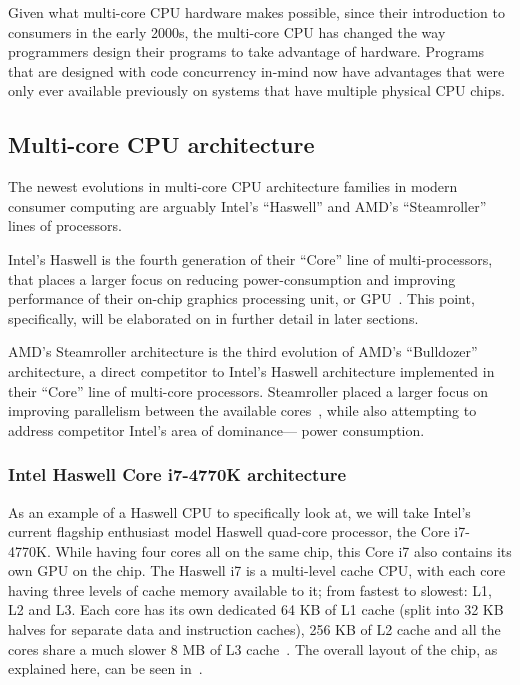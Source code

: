 \documentclass[a4paper,11pt]{article}
\begin{document}
Given what multi-core CPU hardware makes possible, since their introduction to consumers in the early 2000s, the multi-core
CPU has changed the way programmers design their programs to take advantage of hardware. Programs that are designed with
code concurrency in-mind now have advantages that were only ever available previously on systems that have multiple physical
CPU chips.

\subsection{Multi-core CPU architecture} %
\label{sub:multi_core_cpu_architecture}
The newest evolutions in multi-core CPU architecture families in modern consumer computing are arguably Intel's
``Haswell'' and AMD's ``Steamroller'' lines of processors.

Intel's Haswell is the fourth generation of their ``Core'' line of multi-processors, that places a larger focus on reducing power-consumption and improving performance of their on-chip graphics processing unit, or GPU~\cite{web:ForbesHaswell}. This point, specifically, will be elaborated on in further detail in later sections.

AMD's Steamroller architecture is the third evolution of AMD's ``Bulldozer''
architecture, a direct competitor to Intel's Haswell architecture implemented
in their ``Core'' line of multi-core processors. Steamroller placed a larger focus on improving parallelism between the available cores~\cite{web:AMDCCCSlides}, while also attempting to address competitor Intel's area of dominance--- power
consumption.

\subsubsection{Intel Haswell Core i7-4770K architecture} %
\label{subsub:intel_haswell_architecture}
As an example of a Haswell CPU to specifically look at, we will take Intel's
current flagship enthusiast model Haswell quad-core processor, the Core i7-4770K. While having four cores all on the same chip, this Core i7 also
contains its own GPU on the chip. The Haswell i7 is a multi-level cache CPU, with each core having three levels of cache memory
available to it; from fastest to slowest: L1, L2 and L3. Each core has its own
dedicated 64 KB of L1 cache (split into 32 KB halves for separate data and instruction caches), 256 KB of L2 cache and all the cores share a much slower 8 MB of L3 cache~\cite{web:TomsHWCorei7}. The overall layout of the chip, as explained here, can be seen in~.
\end{document}
